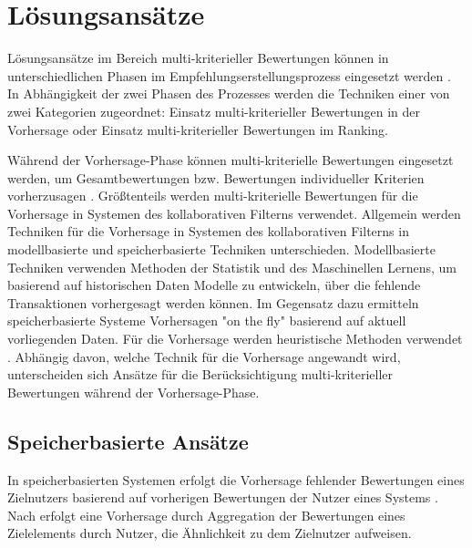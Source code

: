 
\section{Lösungsansätze}
Lösungsansätze im Bereich multi-kriterieller Bewertungen können in unterschiedlichen Phasen im Empfehlungserstellungsprozess eingesetzt werden \cite[S. 854]{adomavicius:4:inbook}.
In Abhängigkeit der zwei Phasen des Prozesses werden die Techniken einer von zwei Kategorien zugeordnet: Einsatz multi-kriterieller Bewertungen in der Vorhersage oder Einsatz multi-kriterieller Bewertungen im Ranking.

Während der Vorhersage-Phase können multi-kriterielle Bewertungen eingesetzt werden, um Gesamtbewertungen bzw. Bewertungen individueller Kriterien vorherzusagen \cite[S. 854]{adomavicius:4:inbook}.
Größtenteils werden multi-kriterielle Bewertungen für die Vorhersage in Systemen des kollaborativen Filterns verwendet.
Allgemein werden Techniken für die Vorhersage in Systemen des kollaborativen Filterns in modellbasierte und speicherbasierte Techniken unterschieden.
Modellbasierte Techniken verwenden Methoden der Statistik und des Maschinellen Lernens, um basierend auf historischen Daten Modelle zu entwickeln, über die fehlende Transaktionen vorhergesagt werden können.
Im Gegensatz dazu ermitteln speicherbasierte Systeme Vorhersagen "on the fly" \cite[S. 855]{adomavicius:4:inbook} basierend auf aktuell vorliegenden Daten.
Für die Vorhersage werden heuristische Methoden verwendet \cite[S. 855]{adomavicius:4:inbook}.
Abhängig davon, welche Technik für die Vorhersage angewandt wird, unterscheiden sich Ansätze für die Berücksichtigung multi-kriterieller Bewertungen während der Vorhersage-Phase.

\subsection{Speicherbasierte Ansätze}
In speicherbasierten Systemen erfolgt die Vorhersage fehlender Bewertungen eines Zielnutzers basierend auf vorherigen Bewertungen der Nutzer eines Systems \cite[S.738]{adomavicius:inproceedings}.
Nach \textcite[S.738]{adomavicius:inproceedings} erfolgt eine Vorhersage durch Aggregation der Bewertungen eines Zielelements durch Nutzer, die Ähnlichkeit zu dem Zielnutzer aufweisen.


